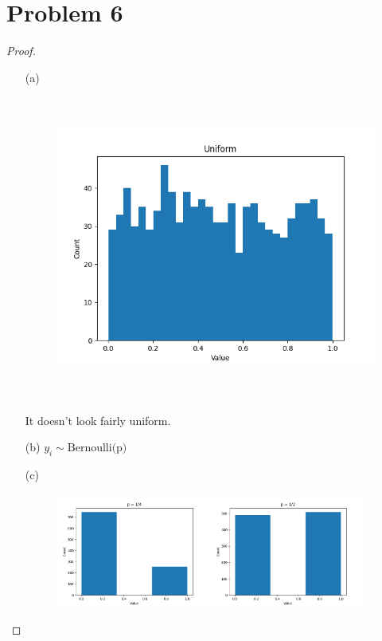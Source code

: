 \documentclass{article}
\begin{document}
\section*{Problem 6}
    \begin{proof}
        \indent
        \begin{itemize}
            \item[(a)]
                \begin{figure}[h!]
                    \includegraphics[height=10cm]{Q6/Figure_1.png}
                    \centering
                \end{figure}
                It doesn't look fairly uniform.
            \item[(b)] $y_i \sim \text{Bernoulli(p)}$
            \item[(c)]
                \begin{figure}[h!]
                    \includegraphics[width=5cm]{Q6/Figure_2.png}
                    \includegraphics[width=5cm]{Q6/Figure_3.png}

\end{figure}
\end{itemize}
\end{proof}
\end{document}
